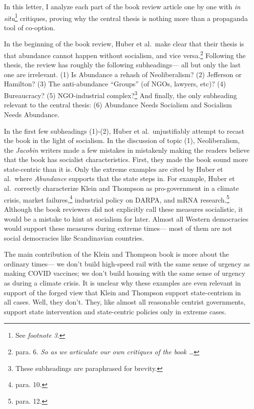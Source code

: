 \documentclass[12pt]{article}
\begin{document}
In this letter, I analyze each part of the book review article one by one with \textit{in situ}\footnote{See \textit{footnote 3}.} critiques, proving why the central thesis is nothing more than a propaganda tool of co-option.

In the beginning of the book review, Huber et al.\ make clear that their thesis is that abundance cannot happen without socialism, and vice versa.\footnote{para. 6. \textit{So as we articulate our own critiques of the book \dots}} Following the thesis, the review has roughly the following subheadings--- all but only the last one are irrelevant. (1) Is Abundance a rehash of Neoliberalism? (2) Jefferson or Hamilton? (3) The anti-abundance ``Groups'' (of NGOs, lawyers, etc)? (4) Bureaucracy? (5) NGO-industrial complex?\footnote{These subheadings are paraphrased for brevity.} And finally, the only subheading relevant to the central thesis: (6) Abundance Needs Socialism and Socialism Needs Abundance.

In the first few subheadings (1)-(2), Huber et al.\ unjustifiably attempt to recast the book in the light of socialism. In the discussion of topic (1), Neoliberalism, the \textit{Jacobin} writers made a few mistakes in mistakenly making the readers believe that the book has socialist characteristics. First, they made the book sound more state-centric than it is. Only the extreme examples are cited by Huber et al.\ where \textit{Abundance} supports that the state steps in. For example, Huber et al.\ correctly characterize Klein and Thompson as pro-government in a climate crisis, market failures,\footnote{para. 10.} industrial policy on DARPA, and mRNA research.\footnote{para. 12.} Although the book reviewers did not explicitly call these measures socialistic, it would be a mistake to hint at socialism for later. Almost all Western democracies would support these measures during extreme times--- most of them are not social democracies like Scandinavian countries. 

The main contribution of the Klein and Thompson book is more about the ordinary times--- we don't build high-speed rail with the same sense of urgency as making COVID vaccines; we don't build housing with the same sense of urgency as during a climate crisis. It is unclear why these examples are even relevant in support of the forged view that Klein and Thompson support state-centrism in all cases. Well, they don't. They, like almost all reasonable centrist governments, support state intervention and state-centric policies only in extreme cases.
\end{document}
